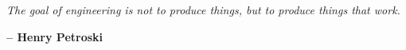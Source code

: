 \chapter*{}
\vspace*{\fill}

\begin{center}
\begin{minipage}{0.5\textwidth}
\itshape
    The goal of engineering is not to produce things, but to produce things that work.
\end{minipage}
\end{center}
\hspace*{0.75\textwidth} {\bfseries -- Henry Petroski}


\vspace*{\fill}
\newpage
